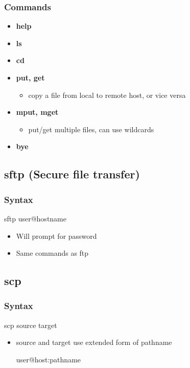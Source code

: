 \documentclass{report}
\begin{document}
    \subsubsection{Commands}
    \bigbreak \noindent 
    \begin{itemize}
        \item \textbf{help}
        \item \textbf{ls}
        \item \textbf{cd} 
        \item \textbf{put, get}
            \begin{itemize}
                \item copy a file from local to remote host, or vice versa 
            \end{itemize}
        \item \textbf{mput, mget}
            \begin{itemize}
                \item put/get multiple files, can use wildcards
            \end{itemize}
        \item \textbf{bye}
    \end{itemize}

    \pagebreak 
    \subsection{sftp (Secure file transfer)}

    \bigbreak \noindent 
    \subsubsection{Syntax}
    \bigbreak \noindent 
    \begin{bashcode}
    sftp user@hostname
    \end{bashcode}
    \bigbreak \noindent 
    \begin{itemize}
        \item Will prompt for password
        \item Same commands as ftp
    \end{itemize}

    \bigbreak \noindent 
    \subsection{scp}
    \bigbreak \noindent 
    \subsubsection{Syntax}
    \bigbreak \noindent 
    \begin{bashcode}
        scp source target
    \end{bashcode}
    \begin{itemize}
        \item source and target use extended form of pathname
            \bigbreak \noindent 
            \begin{bashcode}
            user@host:pathname
            \end{bashcode}
    \end{itemize}
\end{document}
